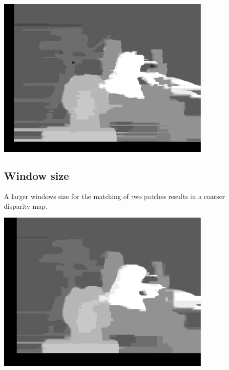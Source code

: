 \documentclass[a4paper]{scrartcl}
\begin{document}
\vspace{1cm}
\begin{minipage}{0.8\textwidth}
  \centering
  \includegraphics[width=0.8\textwidth]{images/defaults.png}
\end{minipage}


\subsection{Window size}

A larger windows size for the matching of two patches results in
a coarser disparity map.

\vspace{1cm}
\begin{minipage}{0.8\textwidth}
  \centering
  \includegraphics[width=0.8\textwidth]{images/window_size-10.png}
\end{minipage}
\end{document}
